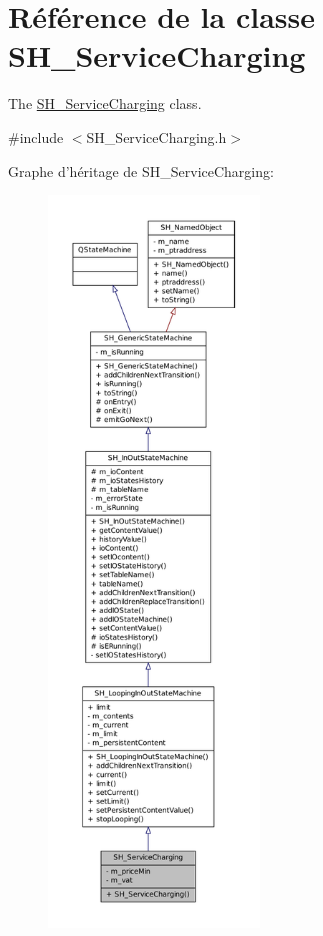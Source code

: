 \hypertarget{classSH__ServiceCharging}{\section{Référence de la classe S\-H\-\_\-\-Service\-Charging}
\label{classSH__ServiceCharging}
}


The \hyperlink{classSH__ServiceCharging}{S\-H\-\_\-\-Service\-Charging} class.  




{\ttfamily \#include $<$S\-H\-\_\-\-Service\-Charging.\-h$>$}



Graphe d'héritage de S\-H\-\_\-\-Service\-Charging\-:
\nopagebreak
\begin{figure}[H]
\begin{center}
\leavevmode
\includegraphics[height=550pt]{classSH__ServiceCharging__inherit__graph}
\end{center}
\end{figure}


